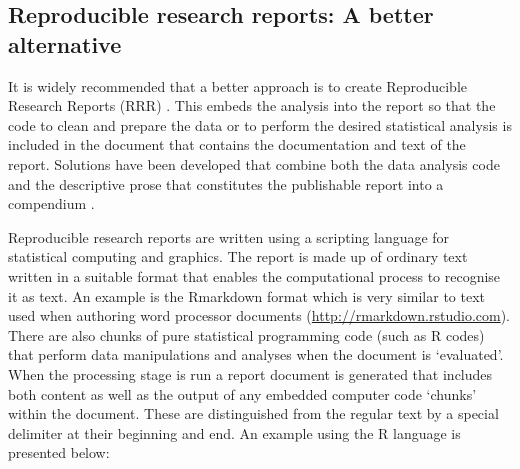 \documentclass[11pt,a4paper]{article}
\begin{document}
\subsection{Reproducible research reports: A better alternative}

It is widely recommended that a better approach is to create Reproducible Research Reports (RRR) \citep{Healy2013}.  This embeds the analysis into the report so that the code to clean and prepare the data or to perform the desired statistical analysis is included in the document that contains the documentation and text of the report. Solutions have been developed that combine both the data analysis code
and the descriptive prose that constitutes the publishable report into
a compendium \citep{Gentleman2004,Schulte}.  

Reproducible research reports are written using a scripting language for
statistical computing and graphics. The report is made up of ordinary
text written in a suitable format that enables the computational process
to recognise it as text. An example is the Rmarkdown format which is
very similar to text used when authoring word processor documents
(\url{http://rmarkdown.rstudio.com}). There are also chunks of pure
statistical programming code (such as R codes) that perform data
manipulations and analyses when the document is `evaluated'. When the
processing stage is run a report document is generated that includes
both content as well as the output of any embedded computer code
`chunks' within the document. These are distinguished from the regular text by a special delimiter at their beginning and end. An example using the R language is presented below:
\clearpage
\end{document}
